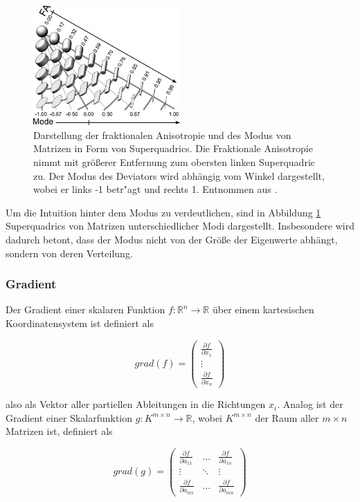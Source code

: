 \documentclass[a4paper,fontsize=12pt,toc=bib,halfparskip]{scrartcl}
\begin{document}
\begin{figure}
	\centering
	\includegraphics[width=0.5\textwidth]{pictures/-001.png}
	\caption{Darstellung der fraktionalen Anisotropie und des Modus von Matrizen in Form von Superquadrics\cite{kindlmann2004superquadric}. Die Fraktionale Anisotropie nimmt mit gr\"o{\ss}erer Entfernung zum obersten linken Superquadric zu. Der Modus des Deviators wird abh\"angig vom Winkel dargestellt, wobei er links -1 betr"agt und rechts 1. Entnommen aus \cite[S.~140]{ennis2006orthogonal}.}
	\label{Modus}
\end{figure}
Um die Intuition hinter dem Modus zu verdeutlichen, sind in Abbildung \ref{Modus} Superquadrics von Matrizen unterschiedlicher Modi dargestellt. Insbesondere wird dadurch betont, dass der Modus nicht von der Gr\"o{\ss}e der Eigenwerte abh\"angt, sondern von deren Verteilung.

\subsubsection{Gradient}
Der Gradient einer skalaren Funktion $f: \mathbb{R}^n \rightarrow \mathbb{R}$  \"uber einem kartesischen Koordinatensystem ist definiert als

\begin{equation}
	grad(f) = 	
	\begin{pmatrix}
		\frac{\partial f}{\partial x_1} \\
		\vdots \\
		\frac{\partial f}{\partial x_n}
	\end{pmatrix}
\end{equation}

also als Vektor aller partiellen Ableitungen in die Richtungen $x_i$. Analog ist der Gradient einer Skalarfunktion $g: K^{m\times n} \rightarrow \mathbb{R}$, wobei $K^{m\times n}$ der Raum aller $m\times n$ Matrizen ist, definiert als

\begin{equation}
	grad(g) =
	\begin{pmatrix}
		\frac{\partial f}{\partial a_{11}} & \dots & \frac{\partial f}{\partial a_{1n}}  \\
		\vdots & \ddots & \vdots \\
		\frac{\partial f}{\partial a_{m1}} & \dots & \frac{\partial f}{\partial a_{mn}} 
	\end{pmatrix}
\end{equation}
\end{document}
